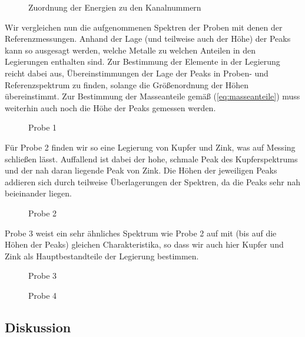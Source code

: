 \documentclass[10pt, a4paper]{article}
\begin{document}
\begin{figure}[h]
\centering

\caption{Zuordnung der Energien zu den Kanalnummern}
\label{fig:energieeichung}
\end{figure}

\clearpage

Wir vergleichen nun die aufgenommenen Spektren der Proben mit denen der Referenzmessungen.
Anhand der Lage (und teilweise auch der Höhe) der Peaks kann so ausgesagt werden, welche Metalle zu welchen Anteilen in den Legierungen enthalten sind.
Zur Bestimmung der Elemente in der Legierung reicht dabei aus, Übereinstimmungen der Lage der Peaks in Proben- und Referenzspektrum zu finden, solange die Größenordnung der Höhen übereinstimmt.
Zur Bestimmung der Masseanteile gemäß (\ref{eq:masseanteile}) muss weiterhin auch noch die Höhe der Peaks gemessen werden.

\begin{figure}[h]
\centering

\caption{Probe 1}
\label{fig:probe1}
\end{figure}

Für Probe 2 finden wir so eine Legierung von Kupfer und Zink, was auf Messing schließen lässt.
Auffallend ist dabei der hohe, schmale Peak des Kupferspektrums und der nah daran liegende Peak von Zink.
Die Höhen der jeweiligen Peaks addieren sich durch teilweise Überlagerungen der Spektren, da die Peaks sehr nah beieinander liegen.

\begin{figure}[!h]
\centering

\caption{Probe 2}
\label{fig:probe2}
\end{figure}

Probe 3 weist ein sehr ähnliches Spektrum wie Probe 2 auf mit (bis auf die Höhen der Peaks) gleichen Charakteristika, so dass wir auch hier Kupfer und Zink als Hauptbestandteile der Legierung bestimmen.

\begin{figure}[!h]
\centering

\caption{Probe 3}
\label{fig:probe3}
\end{figure}

\begin{figure}[h]
\centering

\caption{Probe 4}
\label{fig:probe4}
\end{figure}

\subsection{Diskussion}
\end{document}
